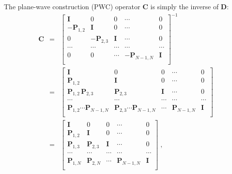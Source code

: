 The plane-wave construction (PWC) operator $\mathbf{C}$ is simply the inverse of
$\mathbf{D}$:
\begin{eqnarray}
  \nonumber 
  \mathbf{C} & = & 
  \left[\begin{array}{ccccc}
      \mathbf{I} & 0 & 0 & \cdots & 0 \\
      - \mathbf{P}_{1,2} & \mathbf{I} & 0 & \cdots & 0 \\
      0 & - \mathbf{P}_{2,3} & \mathbf{I} & \cdots & 0 \\
      \cdots & \cdots & \cdots & \cdots & \cdots \\
      0 & 0 & \cdots & - \mathbf{P}_{N-1,N} & \mathbf{I} \\
    \end{array}\right]^{-1} \\
  \nonumber
  &  = & 
  \left[\begin{array}{ccccc}
      \mathbf{I} & 0 & 0 & \cdots & 0 \\
      \mathbf{P}_{1,2} & \mathbf{I} & 0 & \cdots & 0 \\
      \mathbf{P}_{1,2}\,\mathbf{P}_{2,3} & \mathbf{P}_{2,3} & \mathbf{I} & \cdots & 0 \\
      \cdots & \cdots & \cdots & \cdots & \cdots \\
      \mathbf{P}_{1,2} \cdots \mathbf{P}_{N-1,N} & 
      \mathbf{P}_{2,3} \cdots \mathbf{P}_{N-1,N} & \cdots & 
      \mathbf{P}_{N-1,N} & \mathbf{I} \\
    \end{array}\right] \\
  &  = & 
  \left[\begin{array}{ccccc}
      \mathbf{I} & 0 & 0 & \cdots & 0 \\
      \mathbf{P}_{1,2} & \mathbf{I} & 0 & \cdots & 0 \\
      \mathbf{P}_{1,3} & \mathbf{P}_{2,3} & \mathbf{I} & \cdots & 0 \\
      \cdots & \cdots & \cdots & \cdots & \cdots \\
      \mathbf{P}_{1,N} & 
      \mathbf{P}_{2,N} & \cdots & 
      \mathbf{P}_{N-1,N} & \mathbf{I} \\
    \end{array}\right]
  \;,
  \label{eq:c}
\end{eqnarray}

